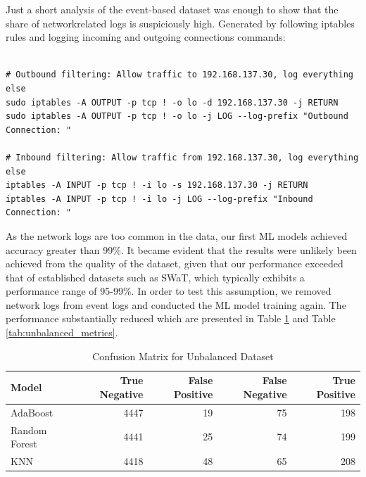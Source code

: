 \documentclass[Master,BMR,english]{twbook}
\begin{document}
Just a short analysis of the event-based dataset was enough to show that the share of networkrelated logs is suspiciously high. Generated by following iptables rules and logging incoming and outgoing connections commands:

\begin{listing}[htbp]
\begin{verbatim}

# Outbound filtering: Allow traffic to 192.168.137.30, log everything else
sudo iptables -A OUTPUT -p tcp ! -o lo -d 192.168.137.30 -j RETURN
sudo iptables -A OUTPUT -p tcp ! -o lo -j LOG --log-prefix "Outbound Connection: "

# Inbound filtering: Allow traffic from 192.168.137.30, log everything else
iptables -A INPUT -p tcp ! -i lo -s 192.168.137.30 -j RETURN
iptables -A INPUT -p tcp ! -i lo -j LOG --log-prefix "Inbound Connection: "

\end{verbatim}
\caption{Iptables rules for logging inbound and outbound connections.}
\end{listing}
As the network logs are too common in the data, our first ML models achieved accuracy greater than 99\%. 
It became evident that the results were unlikely been achieved from the quality of the dataset, given that our performance exceeded that of established datasets such as SWaT, which typically exhibits a performance range of 95-99\%. In order to test this assumption, we removed network logs from event logs and conducted the ML model training again. The performance substantially reduced which are presented in Table \ref{tab:unbalanced_confusion_matrix} and Table \ref{tab:unbalanced_metrics}.

\begin{table}[!htbp]
\centering
\begin{tabular}{|l|r|r|r|r|}
\hline
\textbf{Model} & \textbf{True Negative} & \textbf{False Positive} & \textbf{False Negative} & \textbf{True Positive} \\ \hline
AdaBoost & 4447 & 19 & 75 & 198 \\ \hline
Random Forest & 4441 & 25 & 74 & 199 \\ \hline
KNN & 4418 & 48 & 65 & 208 \\ \hline
\end{tabular}
\caption{Confusion Matrix for Unbalanced Dataset}
\label{tab:unbalanced_confusion_matrix}
\end{table}
\end{document}
